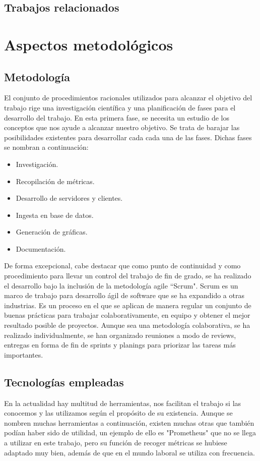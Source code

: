 \documentclass[ spanish, a4paper, 12pt, oneside]{report}
\begin{document}
\section{Trabajos relacionados}




\chapter{Aspectos metodológicos}

\section{Metodología}
El conjunto de procedimientos racionales utilizados para alcanzar el objetivo del trabajo rige una investigación científica y una planificación de fases para el 
desarrollo del trabajo. En esta primera fase, se necesita un estudio de los conceptos que nos ayude a alcanzar nuestro objetivo. Se trata de barajar las posibilidades existentes para desarrollar cada 
cada una de las fases. Dichas fases se nombran a continuación:

\begin{itemize}
   \item Investigación.
   \item Recopilación de métricas.
   \item Desarrollo de servidores y clientes.
   \item Ingesta en base de datos.
   \item Generación de gráficas.
   \item Documentación.
\end{itemize}

De forma excepcional, cabe destacar que como punto de continuidad y como procedimiento para llevar un control del trabajo de fin de grado, se ha realizado el desarrollo bajo la inclusión de la 
metodología agile ``Scrum". Scrum es un marco de trabajo para desarrollo ágil de software que se ha expandido a otras industrias. Es un proceso en el que se aplican de manera regular un conjunto 
de buenas prácticas para trabajar colaborativamente, en equipo y obtener el mejor resultado posible de proyectos. Aunque sea una metodología colaborativa, se ha realizado individualmente, se han organizado 
reuniones a modo de reviews, entregas en forma de fin de sprints y planings para priorizar las tareas más importantes.\\

\section{Tecnologías empleadas}
En la actualidad hay multitud de herramientas, nos facilitan el trabajo si las conocemos y las utilizamos según el propósito de su existencia. 
Aunque se nombren muchas herramientas a continuación, existen muchas otras que también podían haber sido de utilidad, un ejemplo de ello es "Prometheus" 
que no se llega a utilizar en este trabajo, pero su función de recoger métricas se hubiese adaptado muy bien, además de que en el mundo laboral se utiliza con 
frecuencia.\\
\end{document}
